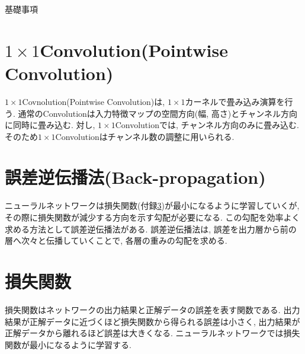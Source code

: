 \begin{chapter}{基礎事項}
\section{$1\times1$Convolution(Pointwise Convolution)}\label{hu:1x1}
$1\times1$Covnolution(Pointwise Convolution)は, $1\times1$カーネルで畳み込み演算を行う. 通常のConvolutionは入力特徴マップの空間方向(幅, 高さ)とチャンネル方向に同時に畳み込む. 対し, $1\times1$Convolutionでは, チャンネル方向のみに畳み込む. そのため$1\times1$Convolutionはチャンネル数の調整に用いられる.  


\section{誤差逆伝播法(Back-propagation)}\label{hu:backprop}
ニューラルネットワークは損失関数(付録\ref{hu:lossfunc})が最小になるように学習していくが, その際に損失関数が減少する方向を示す勾配が必要になる. この勾配を効率よく求める方法として誤差逆伝播法がある. 誤差逆伝播法は, 誤差を出力層から前の層へ次々と伝播していくことで, 各層の重みの勾配を求める. 

\section{損失関数}\label{hu:lossfunc}
損失関数はネットワークの出力結果と正解データの誤差を表す関数である. 出力結果が正解データに近づくほど損失関数から得られる誤差は小さく, 出力結果が正解データから離れるほど誤差は大きくなる. ニューラルネットワークでは損失関数が最小になるように学習する. 


\end{chapter}